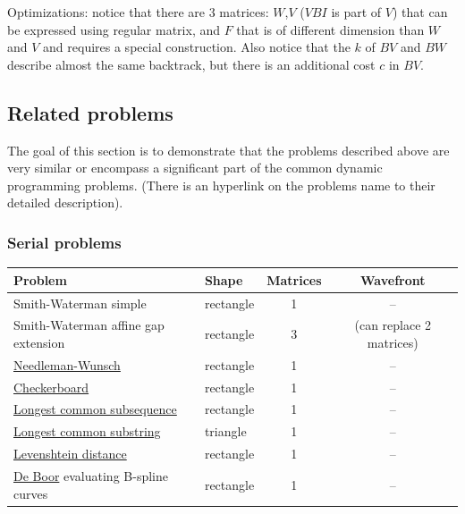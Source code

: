 \item Optimizations: notice that there are 3 matrices: $W$,$V$ ($VBI$ is part of $V$) that can be expressed using regular matrix, and $F$ that is of different dimension than $W$ and $V$ and requires a special construction. Also notice that the $k$ of $BV$ and $BW$ describe almost the same backtrack, but there is an additional cost $c$ in $BV$.
\ole

\newpage
\subsection{Related problems}
The goal of this section is to demonstrate that the problems described above are very similar or encompass a significant part of the common dynamic programming problems. (There is an hyperlink on the problems name to their detailed description).

\subsubsection{Serial problems}
\begin{tabular}{llcc} \toprule
\bf Problem & \bf Shape & \bf Matrices & \bf Wavefront \\ \midrule
Smith-Waterman \footnotesize simple & rectangle & 1 & -- \\
Smith-Waterman \footnotesize affine gap extension & rectangle & 3 & (can replace 2 matrices) \\
\href{http://en.wikipedia.org/wiki/Needleman-Wunsch_algorithm}{Needleman-Wunsch} & rectangle & 1 & -- \\

\href{http://en.wikipedia.org/wiki/Dynamic_programming#Checkerboard}{Checkerboard} & rectangle & 1 & -- \\
\href{http://en.wikipedia.org/wiki/Longest_common_subsequence_problem\#Code_for_the_dynamic_programming_solution}{Longest common subsequence} & rectangle & 1 & -- \\
\href{http://en.wikipedia.org/wiki/Longest_common_substring_problem\#Pseudocode}{Longest common substring} & triangle & 1 & -- \\
\href{http://en.wikipedia.org/wiki/Levenshtein_distance\#Computing_Levenshtein_distance}{Levenshtein distance} & rectangle & 1 & -- \\
\href{http://en.wikipedia.org/wiki/De_Boor's_algorithm}{De Boor} \footnotesize evaluating B-spline curves & rectangle & 1 & -- \\
\end{tabular}

